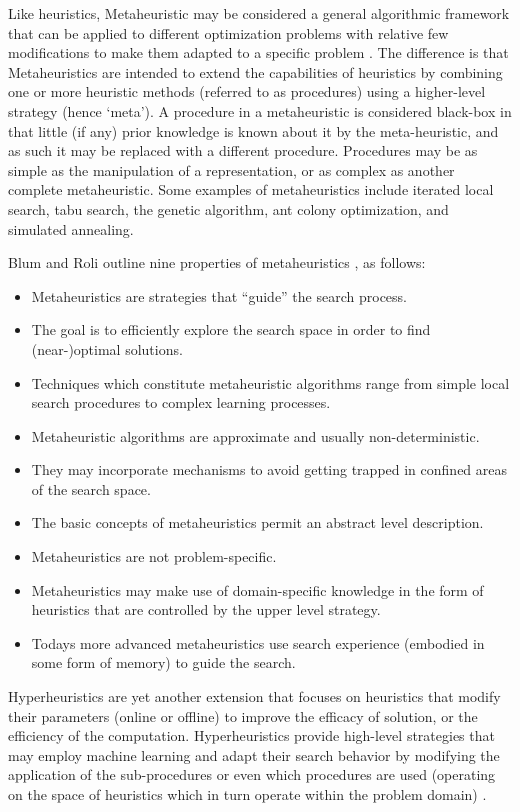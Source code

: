 \begin{bibunit}
Like heuristics, Metaheuristic may be considered a general algorithmic framework that can be applied to different optimization problems with relative few modifications to make them adapted to a specific problem \cite{Glover2003, Talbi2009}. The difference is that Metaheuristics are intended to extend the capabilities of heuristics by combining one or more heuristic methods (referred to as procedures) using a higher-level strategy (hence `meta'). A procedure in a metaheuristic is considered black-box in that little (if any) prior knowledge is known about it by the meta-heuristic, and as such it may be replaced with a different procedure. Procedures may be as simple as the manipulation of a representation, or as complex as another complete metaheuristic. Some examples of metaheuristics include iterated local search, tabu search, the genetic algorithm, ant colony optimization, and simulated annealing.

Blum and Roli outline nine properties of metaheuristics \cite{Blum2003}, as follows: 
\begin{itemize}
	\item Metaheuristics are strategies that ``guide'' the search process.
	\item The goal is to efficiently explore the search space in order to find (near-)optimal solutions.
	\item Techniques which constitute metaheuristic algorithms range from simple local search procedures to complex learning processes.
	\item Metaheuristic algorithms are approximate and usually non-deterministic.
	\item They may incorporate mechanisms to avoid getting trapped in confined areas of the search space.
	\item The basic concepts of metaheuristics permit an abstract level description.
	\item Metaheuristics are not problem-specific.
	\item Metaheuristics may make use of domain-specific knowledge in the form of heuristics that are controlled by the upper level strategy.
	\item Todays more advanced metaheuristics use search experience (embodied in some form of memory) to guide the search.
\end{itemize}

Hyperheuristics are yet another extension that focuses on heuristics that modify their parameters (online or offline) to improve the efficacy of solution, or the efficiency of the computation. Hyperheuristics provide high-level strategies that may employ machine learning and adapt their search behavior by modifying the application of the sub-procedures or even which procedures are used (operating on the space of heuristics which in turn operate within the problem domain) \cite{Burke2003a, Burke2003}. 


\end{bibunit}
